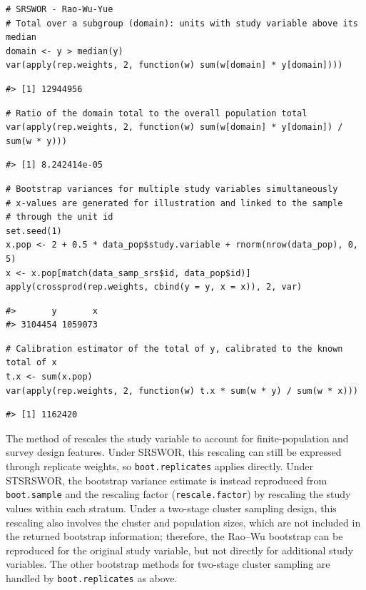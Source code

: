 \begin{verbatim}
# SRSWOR - Rao-Wu-Yue
# Total over a subgroup (domain): units with study variable above its median
domain <- y > median(y)
var(apply(rep.weights, 2, function(w) sum(w[domain] * y[domain])))
\end{verbatim}

\begin{verbatim}
#> [1] 12944956
\end{verbatim}

\begin{verbatim}
# Ratio of the domain total to the overall population total
var(apply(rep.weights, 2, function(w) sum(w[domain] * y[domain]) / sum(w * y)))
\end{verbatim}

\begin{verbatim}
#> [1] 8.242414e-05
\end{verbatim}

\begin{verbatim}
# Bootstrap variances for multiple study variables simultaneously
# x-values are generated for illustration and linked to the sample
# through the unit id
set.seed(1)
x.pop <- 2 + 0.5 * data_pop$study.variable + rnorm(nrow(data_pop), 0, 5)
x <- x.pop[match(data_samp_srs$id, data_pop$id)]
apply(crossprod(rep.weights, cbind(y = y, x = x)), 2, var)
\end{verbatim}

\begin{verbatim}
#>       y       x 
#> 3104454 1059073
\end{verbatim}

\begin{verbatim}
# Calibration estimator of the total of y, calibrated to the known total of x
t.x <- sum(x.pop)
var(apply(rep.weights, 2, function(w) t.x * sum(w * y) / sum(w * x)))
\end{verbatim}

\begin{verbatim}
#> [1] 1162420
\end{verbatim}

The method of \citet{Rao:Wu:1988} rescales the study variable to account for finite-population and survey design features. Under SRSWOR, this rescaling can still be expressed through replicate weights, so \texttt{boot.replicates} applies directly. Under STSRSWOR, the bootstrap variance estimate is instead reproduced from \texttt{boot.sample} and the rescaling factor (\texttt{rescale.factor}) by rescaling the study values within each stratum.
Under a two-stage cluster sampling design, this rescaling also involves the cluster and population sizes, which are not included in the returned bootstrap information; therefore, the Rao--Wu bootstrap can be reproduced for the original study variable, but not directly for additional study variables. The other bootstrap methods for two-stage cluster sampling are handled by \texttt{boot.replicates} as above.


